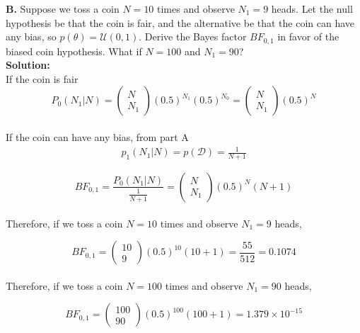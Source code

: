 \documentclass{article}
\begin{document}
\textbf{B. } Suppose we toss a coin $N = 10$ times and observe $N_{1} = 9$ heads. Let the null hypothesis be that the coin is fair, and the alternative be that the coin can have any bias, so $p(\theta) = \mathcal{U}(0,1)$. Derive the Bayes factor $BF_{0,1}$ in favor of the biased coin hypothesis. What if $N = 100$ and $N_{1} = 90$? \\
\textbf{Solution:}\\
If the coin is fair
\begin{equation}
    P_0(N_1 | N) = \left( \begin{array}{c}  N \\  N_1 \end{array} \right) (0.5)^{N_1}(0.5)^{N_0} =  \left( \begin{array}{c}  N \\  N_1 \end{array} \right) (0.5)^{N}
\end{equation} 
\\
If the coin can have any bias, from part A
\begin{equation}
\begin{aligned}
p_1(N_{1}|N) = p(\mathcal{D}) = \frac{1}{N+1}
\end{aligned}
\end{equation}

\begin{equation}
   BF_{0,1} = \frac{P_0(N_1 | N)}{\frac{1}{N+1}}  = \left( \begin{array}{c}  N \\  N_1 \end{array} \right) (0.5)^N (N+1)
\end{equation}\\
Therefore, if we toss a coin $N = 10$ times and observe $N_{1} = 9$ heads,

\begin{equation}
   BF_{0,1} =  \left( \begin{array}{c}  10 \\  9 \end{array} \right) (0.5)^{10} (10+1) = \frac{55}{512} = 0.1074
\end{equation}
\\
Therefore, if we toss a coin $N = 100$ times and observe $N_{1} = 90$ heads,

\begin{equation}
   BF_{0,1} =  \left( \begin{array}{c}  100 \\  90 \end{array} \right) (0.5)^{100} (100+1) = 1.379\times10^{-15}
\end{equation}
\end{document}
